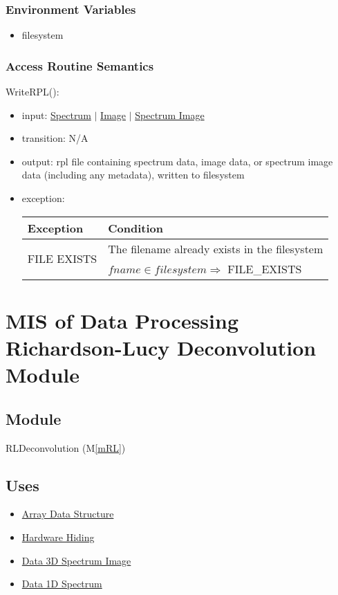 \documentclass[12pt, titlepage]{article}
\newcommand{\mref}[1]{M\ref{#1}}
\begin{document}
\subsubsection{Environment Variables}
\begin{itemize}
    \item filesystem
\end{itemize}

\subsubsection{Access Routine Semantics}

\noindent WriteRPL():
\begin{itemize}
    \item input: \hyperref[Mod:Spectrum]{Spectrum} $|$
    \hyperref[Mod:Image]{Image} $|$ \hyperref[Mod:SI]{Spectrum Image}
    \item transition: N/A
    \item output: rpl file containing spectrum data, image data, or spectrum
    image data (including any metadata), written to filesystem
    \item exception:
    \begin{center}
        \begin{tabular}{p{3cm} p{12cm}}
            \toprule[0.15em]
            \textbf{Exception} & \textbf{Condition}\\
            \midrule[0.1em]
            \multirow{2}{0.25\textwidth}{FILE EXISTS} & The filename already
            exists in the filesystem\\ 
            & $fname \in filesystem \Rightarrow$ FILE\_EXISTS\\ 
            \bottomrule[0.15em]
        \end{tabular}
    \end{center}
\end{itemize}

\section{MIS of Data Processing Richardson-Lucy Deconvolution Module}
\label{Mod: RLDeconvolution}

\subsection{Module}

RLDeconvolution (\mref{mRL})

\subsection{Uses}
\begin{itemize}
    \item \hyperref[Mod:Array]{Array Data Structure}
    \item \hyperref[Mod:HH]{Hardware Hiding}
    \item \hyperref[Mod:SI]{Data 3D Spectrum Image}
    \item \hyperref[Mod:Spectrum]{Data 1D Spectrum}
\end{itemize}
\end{document}
